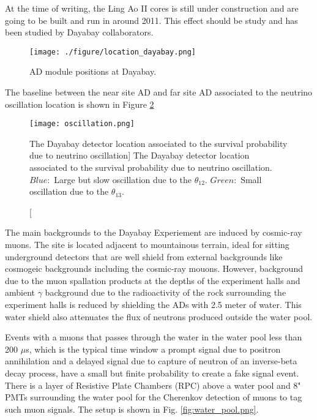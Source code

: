 At the time of writing, the Ling Ao II cores is still under construction and are going to be built and run in around
2011. This effect should be study and has been studied by Dayabay collaborators.


\begin{figure}
    \centering
    \texttt{[image: ./figure/location\_dayabay.png]}
    \caption{AD module positions at Dayabay.}
    \label{fig:location_dayabay.png}
    \end{figure}


The baseline between the near site AD and far site AD associated to the neutrino oscillation
location is shown in Figure \ref{fig:oscillation}


\begin{figure}
    \label{fig:oscillation}
    \centering
    \texttt{[image: oscillation.png]}
    \caption
    [The Dayabay detector location associated to the survival probability due to neutrino oscillation]
    {The Dayabay detector location associated to the survival probability due to neutrino oscillation.
$Blue:$ Large but slow oscillation due to the $\theta_{12}$. $Green:$ Small oscillation due to the $\theta_{13}$.}
    \end{figure}




The main backgrounds to the Dayabay Experiement are induced by cosmic-ray muons.
The site is located adjacent to mountainous terrain, ideal for sitting underground detectors that
are well shield from external backgrounds like cosmogeic backgrounds including the cosmic-ray mouons.
However, background due to the muon spallation products at the depths of the experiment halls and ambient
$\gamma$ background due to the radioactivity of the rock surrounding the experiment halls is reduced by shielding
the ADs with 2.5 meter of water. This water shield also attenuates the flux of neutrons produced outside the water
pool.

Events with a muons that passes through the water in the water pool less than 200 $\mu$s, which is the typical time window
a prompt signal due to positron annihilation and a delayed signal due to capture of neutron of an inverse-beta decay process, have a small but finite
probability to create a fake signal event.
There is a layer of  Resistive Plate Chambers (RPC) above a water pool
and 8" PMTs surrounding the water pool for the Cherenkov detection of muons to tag such muon signals.
The setup is shown in Fig. \ref{fig:water_pool.png}.


